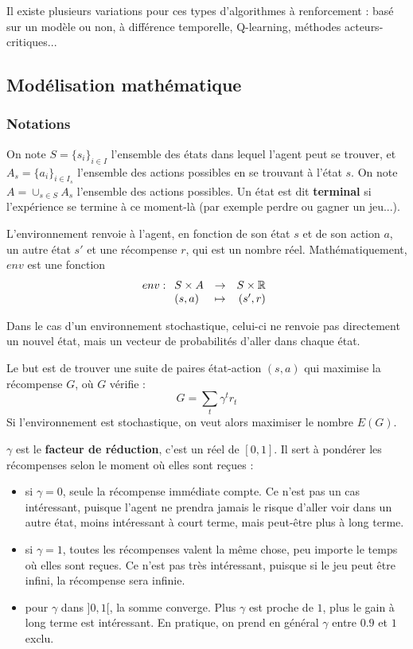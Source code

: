 Il existe plusieurs variations pour ces types d'algorithmes à renforcement : basé sur un modèle ou non, à différence temporelle, Q-learning, méthodes acteurs-critiques...

\subsection{Modélisation mathématique}
\subsubsection{Notations}

On note $S=\lbrace s_i \rbrace_{i \in I} $ l'ensemble des états dans lequel l'agent peut se trouver, et $A_s = \lbrace a_i \rbrace_{i \in I_s} $ l'ensemble des actions possibles en se trouvant à l'état $s$. On note $A = \cup_{s \in S} A_s$ l'ensemble des actions possibles. Un état est dit \textbf{terminal} si l'expérience se termine à ce moment-là (par exemple perdre ou gagner un jeu...).

L'environnement renvoie à l'agent, en fonction de son état $s$ et de son action $a$, un autre état $s'$ et une récompense $r$, qui est un nombre réel. Mathématiquement, $env$ est une fonction $$env :\begin{array}[t]{lcr}
S\times A &\rightarrow& S \times \mathbb{R}\\
(s,a) & \mapsto & (s', r)\\\end{array}$$

Dans le cas d'un environnement stochastique, celui-ci ne renvoie pas directement un nouvel état, mais un vecteur de probabilités d'aller dans chaque état. 

Le but est de trouver une suite de paires état-action $(s,a)$ qui maximise la récompense $G$, où $G$ vérifie :
$$G = \sum_{t} \gamma ^t r_t$$
Si l'environnement est stochastique, on veut alors maximiser le nombre $E(G)$.


$\gamma$ est le \textbf{facteur de réduction}, c'est un réel de $[0,1]$. Il sert à pondérer les récompenses selon le moment où elles sont reçues : 

\begin{itemize}
\item si $\gamma=0$, seule la récompense immédiate compte. Ce n'est pas un cas intéressant, puisque l'agent ne prendra jamais le risque d'aller voir dans un autre état, moins intéressant à court terme, mais peut-être plus à long terme. 
\item si $\gamma=1$, toutes les récompenses valent la même chose, peu importe le temps où elles sont reçues. Ce n'est pas très intéressant, puisque si le jeu peut être infini, la récompense sera infinie.
\item pour $\gamma$ dans $]0,1[$, la somme converge. Plus $\gamma$ est proche de $1$, plus le gain à long terme est intéressant. En pratique, on prend en général $\gamma$ entre $0.9$ et $1$ exclu.
\end{itemize}

